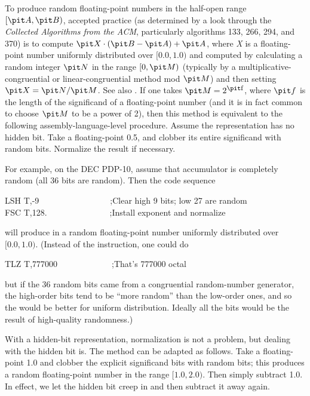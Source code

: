 \begin{defun}[Function]
\begin{implementation}
To produce random floating-point numbers in the half-open
range $[{\it A},{\it B})$,
accepted practice (as determined by a look through the
{\it Collected Algorithms from the ACM}, particularly algorithms
133, 266, 294, and 370) is to compute ${\it X}\cdot({\it B}-{\it A})+{\it A}$,
where {\it X} is a floating-point number uniformly distributed over
$[0.0, 1.0)$
and computed by calculating a random integer ${\it N}$ in the range
$[0,{\it M})$
(typically by a multiplicative-congruential or linear-congruential method
mod ${\it M}$) and then setting ${\it X}={\it N}/{\it M}$.  See also \cite{KNUTH-VOLUME-2}.
If one takes ${\it M}=2^{\hbox{\footnotesize\it f}}$, where ${\it f}$ is the length of the significand
of a floating-point number (and it is in fact common to choose ${\it M}$
to be a power of 2), then this method is equivalent to the following
assembly-language-level procedure.  Assume the representation
has no hidden bit.  Take a floating-point 0.5,
and clobber its entire significand with random bits.  Normalize the
result if necessary.

For example, on the DEC PDP-10, assume that accumulator  is completely random
(all 36 bits are random).  Then the code sequence
\begin{lisp}
LSH T,-9~~~~~~~~~~~~~~~~~;{\rm Clear high 9 bits; low 27 are random} \\
FSC T,128.~~~~~~~~~~~~~~~;{\rm Install exponent and normalize}
\end{lisp}
will produce in  a random floating-point number uniformly distributed
over $[0.0, 1.0)$.  (Instead of the  instruction,
one could do
\begin{lisp}
TLZ T,777000~~~~~~~~~~~~~;{\rm That's 777000 octal}
\end{lisp}
but if the 36 random bits came from a congruential random-number generator,
the high-order bits tend to be ``more random'' than the low-order ones,
and so the  would be better for uniform distribution.
Ideally all the bits would be the result of high-quality randomness.)

With a hidden-bit representation, normalization is not a problem,
but dealing with the hidden bit is.  The method can be adapted as follows.
Take a floating-point 1.0 and clobber the explicit significand bits with
random bits; this produces a random floating-point number in
the range $[1.0, 2.0)$.  Then simply subtract 1.0.  In effect, we
let the hidden bit creep in and then subtract it away again.


\end{implementation}
\end{defun}
